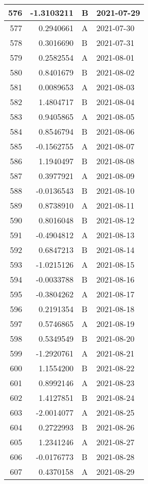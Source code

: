 \begin{tabular}{r|r|l|l}
\hline
576 & -1.3103211 & B & 2021-07-29\\
\hline
577 & 0.2940661 & A & 2021-07-30\\
\hline
578 & 0.3016690 & B & 2021-07-31\\
\hline
579 & 0.2582554 & A & 2021-08-01\\
\hline
580 & 0.8401679 & B & 2021-08-02\\
\hline
581 & 0.0089653 & A & 2021-08-03\\
\hline
582 & 1.4804717 & B & 2021-08-04\\
\hline
583 & 0.9405865 & A & 2021-08-05\\
\hline
584 & 0.8546794 & B & 2021-08-06\\
\hline
585 & -0.1562755 & A & 2021-08-07\\
\hline
586 & 1.1940497 & B & 2021-08-08\\
\hline
587 & 0.3977921 & A & 2021-08-09\\
\hline
588 & -0.0136543 & B & 2021-08-10\\
\hline
589 & 0.8738910 & A & 2021-08-11\\
\hline
590 & 0.8016048 & B & 2021-08-12\\
\hline
591 & -0.4904812 & A & 2021-08-13\\
\hline
592 & 0.6847213 & B & 2021-08-14\\
\hline
593 & -1.0215126 & A & 2021-08-15\\
\hline
594 & -0.0033788 & B & 2021-08-16\\
\hline
595 & -0.3804262 & A & 2021-08-17\\
\hline
596 & 0.2191354 & B & 2021-08-18\\
\hline
597 & 0.5746865 & A & 2021-08-19\\
\hline
598 & 0.5349549 & B & 2021-08-20\\
\hline
599 & -1.2920761 & A & 2021-08-21\\
\hline
600 & 1.1554200 & B & 2021-08-22\\
\hline
601 & 0.8992146 & A & 2021-08-23\\
\hline
602 & 1.4127851 & B & 2021-08-24\\
\hline
603 & -2.0014077 & A & 2021-08-25\\
\hline
604 & 0.2722993 & B & 2021-08-26\\
\hline
605 & 1.2341246 & A & 2021-08-27\\
\hline
606 & -0.0176773 & B & 2021-08-28\\
\hline
607 & 0.4370158 & A & 2021-08-29\\

\end{tabular}
